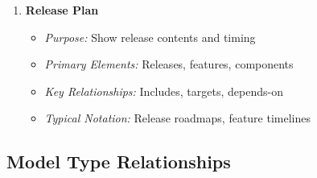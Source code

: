 \documentclass[11pt,letterpaper]{article}
\begin{document}
\begin{enumerate}[label=\textbf{MT\arabic*:}, leftmargin=2.5em]
    \item \textbf{Release Plan}
    \begin{itemize}[nosep]
        \item \textit{Purpose:} Show release contents and timing
        \item \textit{Primary Elements:} Releases, features, components
        \item \textit{Key Relationships:} Includes, targets, depends-on
        \item \textit{Typical Notation:} Release roadmaps, feature timelines
    \end{itemize}
\end{enumerate}

\subsection{Model Type Relationships}
\end{document}
